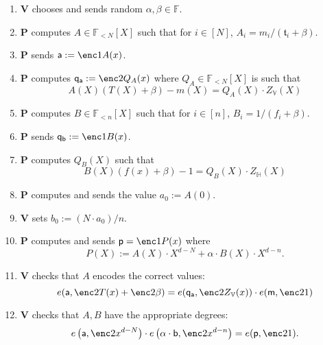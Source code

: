 \documentclass[11pt]{article} %
\newcommand{\F}{\ensuremath{\mathbb F}\xspace}
\newcommand{\defeq}{:=}
\newcommand{\prv}{\ensuremath{\mathsf{\mathbf{P}}}\xspace}
\newcommand{\ver}{\ensuremath{\mathsf{\mathbf{V}}}\xspace}
\newcommand{\polysofdeg}[1]{\ensuremath{\F_{< #1}[X]}\xspace}
\newcommand{\subspace}{\ensuremath{\mathbb{H}}\xspace}
\newcommand{\bigspace}{\ensuremath{\mathbb{V}}\xspace}
\newcommand{\witsize}{\ensuremath{n}\xspace}
\newcommand{\tabsize}{\ensuremath{N}\xspace}
\newcommand{\tab}{\ensuremath{\mathfrak{t}}\xspace}
\renewcommand{\a}{\ensuremath{\mathsf{a}}\xspace}
\renewcommand{\b}{\ensuremath{\mathsf{b}}\xspace}
\renewcommand{\p}{\ensuremath{\mathsf{p}}\xspace}
\newcommand{\qa}{\ensuremath{\mathsf{q_a}}\xspace}
\newcommand{\qb}{\ensuremath{\mathsf{q_b}}\xspace}
\newcommand{\m}{\ensuremath{\mathsf{m}}\xspace}
\begin{document}
\begin{enumerate}
 \item \ver chooses and sends random $\alpha,\beta \in \F$.
\item \prv computes $A\in \polysofdeg{\tabsize}$ such that for $i\in [\tabsize]$, $A_i = m_i/(\tab_i+\beta)$.
\item \prv sends $\a\defeq \enc1{A(x)}$.
\item\label{step:computeQA} \prv computes $\qa \defeq \enc2{Q_A(x)}$ where $Q_A\in \polysofdeg{\tabsize}$ is such that 
\[A(X)(T(X)+\beta)-m(X)= Q_A(X)\cdot Z_\bigspace(X)\]
\item \prv computes $B\in \polysofdeg{\witsize}$ such that for $i\in [\witsize]$, $B_i=1/(f_i+\beta)$.
\item \prv sends $\qb\defeq \enc1{B(x)}$.
\item \prv computes $Q_B(X)$ such that 
\[B(X)(f(x)+\beta)-1 = Q_B(X)\cdot Z_\subspace(X)\]
\item \prv computes and sends the value $a_0\defeq A(0)$.
\item \ver  sets $b_0\defeq (\tabsize\cdot a_0)/\witsize$.
\item \prv computes and sends $\p=\enc1{P(x)}$ where
\[P(X)\defeq A(X)\cdot X^{d-\tabsize}+\alpha\cdot B(X)\cdot X^{d-\witsize}. \]
\item\label{step:checkqa} \ver checks that $A$ encodes the correct values:
\[e(\a,\enc2{T(x)}+\enc2{\beta} )=e(\qa,\enc2{Z_\bigspace(x)})\cdot e(\m,\enc2{1})\]
\item\label{step:checkadeg} \ver checks that $A,B$ have the appropriate degrees:
\[e\left(\a,\enc2{x^{d-\tabsize}}\right)\cdot e\left(\alpha\cdot \b,\enc2{x^{d-\witsize}}\right)=e(\p,\enc2{1}).\]
 \end{enumerate}
\end{document}
